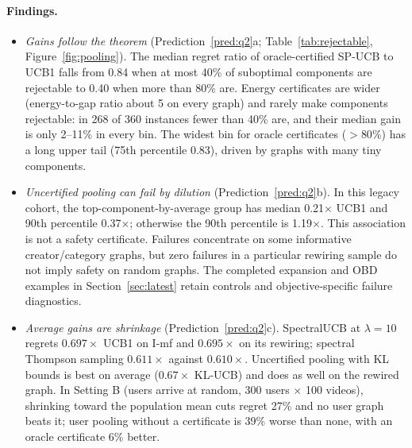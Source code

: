 \documentclass[11pt]{article}
\theoremstyle{definition}
\theoremstyle{remark}
\begin{document}
\paragraph{Findings.}
\begin{itemize}
\item \emph{Gains follow the theorem} (Prediction~\ref{pred:q2}a; Table~\ref{tab:rejectable}, Figure~\ref{fig:pooling}). The median regret ratio of oracle-certified SP-UCB to UCB1 falls from 0.84 when at most 40\% of suboptimal components are rejectable to 0.40 when more than 80\% are. Energy certificates are wider (energy-to-gap ratio about 5 on every graph) and rarely make components rejectable: in 268 of 360 instances fewer than 40\% are, and their median gain is only 2--11\% in every bin. The widest bin for oracle certificates ($>80\%$) has a long upper tail (75th percentile 0.83), driven by graphs with many tiny components.
\item \emph{Uncertified pooling can fail by dilution} (Prediction~\ref{pred:q2}b). In this legacy cohort, the top-component-by-average group has median 0.21$\times$ UCB1 and 90th percentile 0.37$\times$; otherwise the 90th percentile is 1.19$\times$. This association is not a safety certificate. Failures concentrate on some informative creator/category graphs, but zero failures in a particular rewiring sample do not imply safety on random graphs. The completed expansion and OBD examples in Section~\ref{sec:latest} retain controls and objective-specific failure diagnostics.
\item \emph{Average gains are shrinkage} (Prediction~\ref{pred:q2}c). SpectralUCB at $\lambda=10$ regrets $0.697\times$ UCB1 on I-mf and $0.695\times$ on its rewiring; spectral Thompson sampling $0.611\times$ against $0.610\times$. Uncertified pooling with KL bounds is best on average ($0.67\times$ KL-UCB) and does as well on the rewired graph. In Setting B (users arrive at random, 300 users $\times$ 100 videos), shrinking toward the population mean cuts regret 27\% and no user graph beats it; user pooling without a certificate is 39\% worse than none, with an oracle certificate 6\% better.
\end{itemize}
\end{document}
